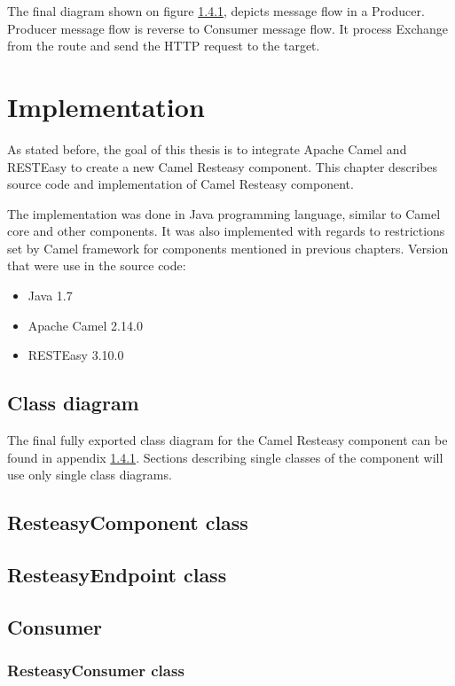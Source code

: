 \documentclass[12pt,final,oneside]{fithesis2}
\begin{document}
The final diagram shown on figure \ref{}, depicts message flow in a Producer. Producer message flow is reverse to Consumer message flow. It process Exchange from the route and send the HTTP request to the target. 


\chapter{Implementation}
As stated before, the goal of this thesis is to integrate Apache Camel and RESTEasy to create a new Camel Resteasy component. This chapter describes source code and implementation of Camel Resteasy component. 

The implementation was done in Java programming language, similar to Camel core and other components. It was also implemented with regards to restrictions set by Camel framework for components mentioned in previous chapters. Version that were use in the source code:
\begin{itemize}
\item
Java 1.7

\item
Apache Camel 2.14.0

\item
RESTEasy 3.10.0
\end{itemize}

\section{Class diagram}
The final fully exported class diagram for the Camel Resteasy component can be found in appendix \ref{}. Sections describing single classes of the component will use only single class diagrams.

\section{ResteasyComponent class}

\section{ResteasyEndpoint class}

\section{Consumer}

\subsection{ResteasyConsumer class}
\end{document}
